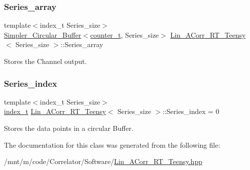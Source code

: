 \mbox{\label{classLin__ACorr__RT__Teensy_a9a619d1a74076f0bac8b7f03acebbb75}} 
\subsubsection{\texorpdfstring{Series\+\_\+array}{Series\_array}}
{\footnotesize\ttfamily template$<$index\+\_\+t Series\+\_\+size$>$ \\
\hyperlink{classSimpler__Circular__Buffer}{Simpler\+\_\+\+Circular\+\_\+\+Buffer}$<$\hyperlink{types_8hpp_ac89ac912f524b3e3fa3720ea55fec966}{counter\+\_\+t}, Series\+\_\+size$>$ \hyperlink{classLin__ACorr__RT__Teensy}{Lin\+\_\+\+A\+Corr\+\_\+\+R\+T\+\_\+\+Teensy}$<$ Series\+\_\+size $>$\+::Series\+\_\+array}



Stores the Channel output. 

\mbox{\label{classLin__ACorr__RT__Teensy_a495539383a4cab5ff611545361600599}} 
\subsubsection{\texorpdfstring{Series\+\_\+index}{Series\_index}}
{\footnotesize\ttfamily template$<$index\+\_\+t Series\+\_\+size$>$ \\
\hyperlink{types_8hpp_a7c40bb931c31595ed6308605f4537447}{index\+\_\+t} \hyperlink{classLin__ACorr__RT__Teensy}{Lin\+\_\+\+A\+Corr\+\_\+\+R\+T\+\_\+\+Teensy}$<$ Series\+\_\+size $>$\+::Series\+\_\+index = 0}



Stores the data points in a circular Buffer. 



The documentation for this class was generated from the following file\+:\begin{DoxyCompactItemize}
\item 
/mnt/m/code/\+Correlator/\+Software/\hyperlink{Lin__ACorr__RT__Teensy_8hpp}{Lin\+\_\+\+A\+Corr\+\_\+\+R\+T\+\_\+\+Teensy.\+hpp}\end{DoxyCompactItemize}
